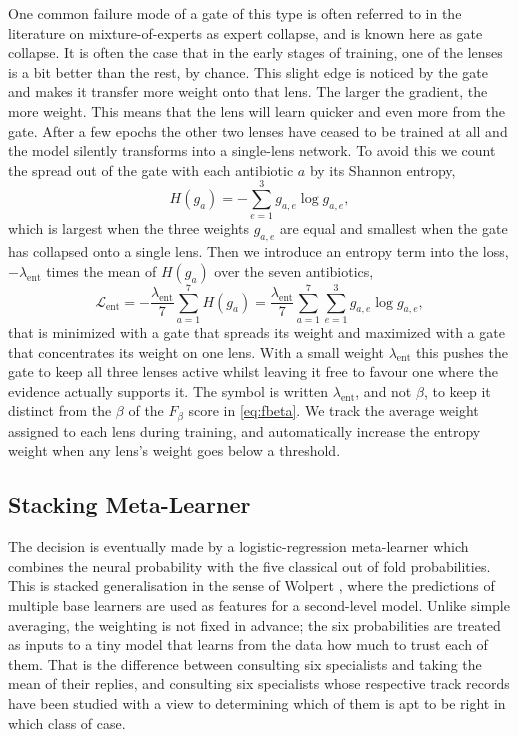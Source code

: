 \documentclass[journal]{IEEEtran}
\begin{document}
One common failure mode of a gate of this type is often referred to in the literature
on mixture-of-experts as expert collapse, and is known here as gate collapse. It is
often the case that in the early stages of training, one of the lenses is a bit
better than the rest, by chance. This slight edge is noticed by the gate and makes it
transfer more weight onto that lens. The larger the gradient, the more weight. This
means that the lens will learn quicker and even more from the gate. After a few
epochs the other two lenses have ceased to be trained at all and the model silently
transforms into a single-lens network. To avoid this we count the spread out of the
gate with each antibiotic $a$ by its Shannon entropy,
\begin{equation}
H(g_a) = -\sum_{e=1}^{3} g_{a,e} \log g_{a,e},
\label{eq:gate_entropy}
\end{equation}
which is largest when the three weights $g_{a,e}$ are equal and smallest when the
gate has collapsed onto a single lens. Then we introduce an entropy term into the
loss, $-\lambda_{\mathrm{ent}}$ times the mean of $H(g_a)$ over the seven antibiotics,
\begin{equation}
\mathcal{L}_{\mathrm{ent}}
  = -\frac{\lambda_{\mathrm{ent}}}{7} \sum_{a=1}^{7} H(g_a)
  = \frac{\lambda_{\mathrm{ent}}}{7} \sum_{a=1}^{7} \sum_{e=1}^{3}
    g_{a,e} \log g_{a,e},
\label{eq:entropy_reg}
\end{equation}
that is minimized with a gate that spreads its weight and maximized with a gate that
concentrates its weight on one lens. With a small weight $\lambda_{\mathrm{ent}}$ this
pushes the gate to keep all three lenses active whilst leaving it free to favour one
where the evidence actually supports it. The symbol is written
$\lambda_{\mathrm{ent}}$, and not $\beta$, to keep it distinct from the $\beta$ of the
$F_\beta$ score in \eqref{eq:fbeta}. We track the average weight assigned to each lens
during training, and automatically increase the entropy weight when any lens's weight
goes below a threshold.

\subsection{Stacking Meta-Learner}
\label{subsec:metalearner}

The decision is eventually made by a logistic-regression meta-learner which combines
the neural probability with the five classical out of fold probabilities. This is
stacked generalisation in the sense of Wolpert \cite{wolpert1992stacked}, where the
predictions of multiple base learners are used as features for a second-level model.
Unlike simple averaging, the weighting is not fixed in advance; the six probabilities
are treated as inputs to a tiny model that learns from the data how much to trust
each of them. That is the difference between consulting six specialists and taking
the mean of their replies, and consulting six specialists whose respective track
records have been studied with a view to determining which of them is apt to be right
in which class of case.
\end{document}
